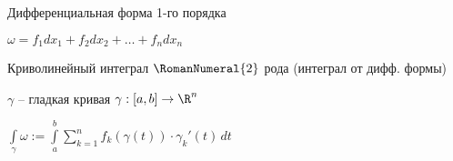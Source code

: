 
\begin{definition}\thmslashn
	
	Дифференциальная форма 1-го порядка
	
	$\omega = f_1 dx_1 + f_2dx_2 + \ldots + f_ndx_n$
	
\end{definition}


\begin{definition}\thmslashn
	
	Криволинейный интеграл $\RomanNumeral{2}$ рода (интеграл от дифф. формы)
	
	$\gamma$ -- гладкая кривая $\gamma: [a, b] \to \R^n$
	
	$\int\limits_\gamma \omega := \int\limits_a^b \sum\limits_{k=1}^n f_k(\gamma(t)) \cdot \gamma_k'(t)\,dt$
	
\end{definition}

